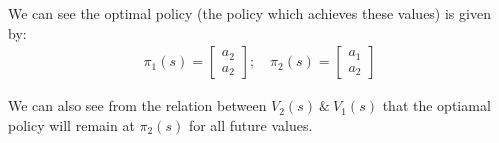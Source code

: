 \documentclass[11pt]{article}
\begin{document}
We can see the optimal policy (the policy which achieves these values) is given by:
\begin{align}
    \pi_1(s) = \begin{bmatrix}
        a_2 \\
        a_2
    \end{bmatrix};\quad
    \pi_2(s) = \begin{bmatrix}
        a_1 \\
        a_2
    \end{bmatrix}
\end{align}

We can also see from the relation between $V_2(s)\ \&\ V_1(s)$ that the optiamal policy will remain at $\pi_2(s)$ for all future values. 
\end{document}
